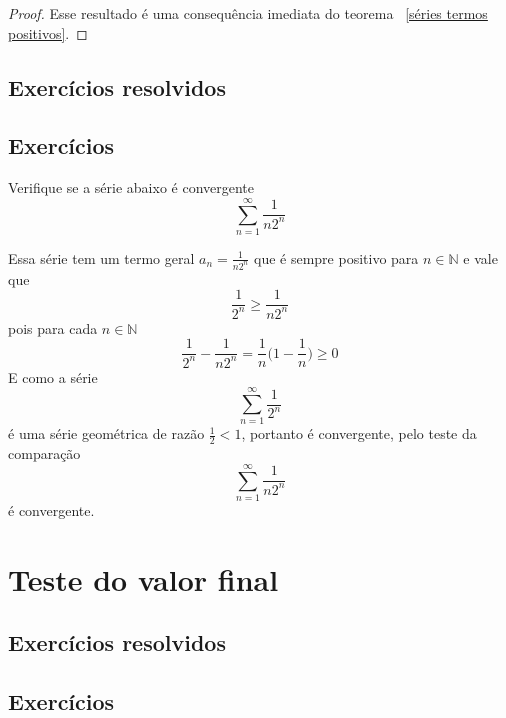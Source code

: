 \begin{proof}
    Esse resultado é uma consequência imediata do teorema ~\ref{séries termos positivos}.
\end{proof}

\subsection*{Exercícios resolvidos}

\construirExeresol


\subsection*{Exercícios}

\construirExer

\begin{exer}
    Verifique se a série abaixo é convergente 
    $$\sum_{n =1}^{\infty} \frac{1}{n2^n}$$
\end{exer}

\begin{resp}
    Essa série tem um termo geral $a_n = \frac{1}{n2^n}$ que é sempre positivo
    para $n \in \mathbb{N}$ e vale que 
    $$\frac{1}{2^n} \geq \frac{1}{n2^n} $$
    pois para cada $n \in \mathbb{N}$
    $$\frac{1}{2^n} - \frac{1}{n2^n} = \frac{1}{n}\bigg(1 - \frac{1}{n}\bigg) \geq 0$$
    E como a série  $$\sum_{n =1}^{\infty} \frac{1}{2^n}$$ é uma série geométrica
    de razão $\frac{1}{2} < 1$, portanto é convergente, pelo teste da comparação 
    $$\sum_{n =1}^{\infty} \frac{1}{n2^n}$$
    é convergente.
\end{resp}

\section{Teste do valor final}
\construirSec

\subsection*{Exercícios resolvidos}

\construirExeresol


\subsection*{Exercícios}

\construirExer


